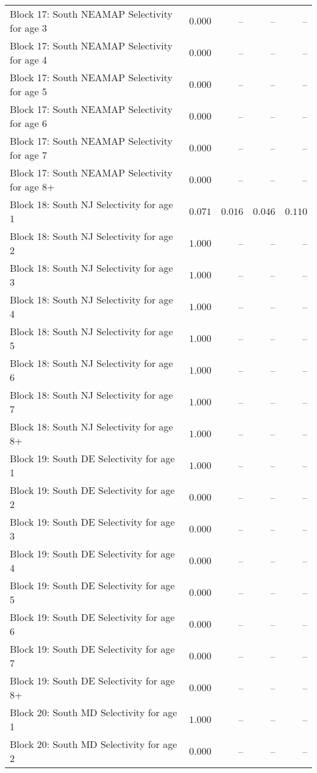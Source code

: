 \documentclass[
]{article}
\begin{document}
\begin{landscape}
\begin{longtable}[t]{lrrrr}
Block 17: South NEAMAP Selectivity for age 3 & $0.000$ & -- & -- & --\\
Block 17: South NEAMAP Selectivity for age 4 & $0.000$ & -- & -- & --\\
Block 17: South NEAMAP Selectivity for age 5 & $0.000$ & -- & -- & --\\
\addlinespace
Block 17: South NEAMAP Selectivity for age 6 & $0.000$ & -- & -- & --\\
Block 17: South NEAMAP Selectivity for age 7 & $0.000$ & -- & -- & --\\
Block 17: South NEAMAP Selectivity for age 8+ & $0.000$ & -- & -- & --\\
Block 18: South NJ Selectivity for age 1 & $0.071$ & $0.016$ & $0.046$ & $0.110$\\
Block 18: South NJ Selectivity for age 2 & $1.000$ & -- & -- & --\\
\addlinespace
Block 18: South NJ Selectivity for age 3 & $1.000$ & -- & -- & --\\
Block 18: South NJ Selectivity for age 4 & $1.000$ & -- & -- & --\\
Block 18: South NJ Selectivity for age 5 & $1.000$ & -- & -- & --\\
Block 18: South NJ Selectivity for age 6 & $1.000$ & -- & -- & --\\
Block 18: South NJ Selectivity for age 7 & $1.000$ & -- & -- & --\\
\addlinespace
Block 18: South NJ Selectivity for age 8+ & $1.000$ & -- & -- & --\\
Block 19: South DE Selectivity for age 1 & $1.000$ & -- & -- & --\\
Block 19: South DE Selectivity for age 2 & $0.000$ & -- & -- & --\\
Block 19: South DE Selectivity for age 3 & $0.000$ & -- & -- & --\\
Block 19: South DE Selectivity for age 4 & $0.000$ & -- & -- & --\\
\addlinespace
Block 19: South DE Selectivity for age 5 & $0.000$ & -- & -- & --\\
Block 19: South DE Selectivity for age 6 & $0.000$ & -- & -- & --\\
Block 19: South DE Selectivity for age 7 & $0.000$ & -- & -- & --\\
Block 19: South DE Selectivity for age 8+ & $0.000$ & -- & -- & --\\
Block 20: South MD Selectivity for age 1 & $1.000$ & -- & -- & --\\
\addlinespace
Block 20: South MD Selectivity for age 2 & $0.000$ & -- & -- & --\\

\end{longtable}
\end{landscape}
\end{document}
